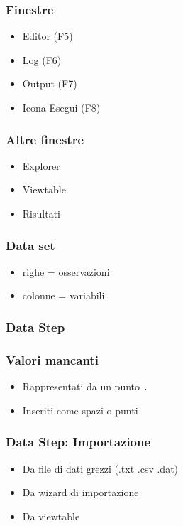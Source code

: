 \begin{frame}\frametitle{Finestre}
  \begin{itemize}
  \item
    Editor (F5)
  \item
    Log (F6)
  \item
    Output (F7)
  \item
    Icona Esegui (F8)
  \end{itemize}
\end{frame}

\begin{frame}\frametitle{Altre finestre}
  \begin{itemize}
  \item
    Explorer
  \item
    Viewtable
  \item
    Risultati
  \end{itemize}
\end{frame}

\begin{frame}\frametitle{Data set}
  \begin{itemize}
  \item
    righe = osservazioni
  \item
    colonne = variabili
  \end{itemize}
\end{frame}

\begin{frame}[fragile]\frametitle{Data Step}
\end{frame}


\begin{frame}\frametitle{Valori mancanti}
  \begin{itemize}
  \item
    Rappresentati da un punto \texttt{.}
  \item
    Inseriti come spazi o punti
  \end{itemize}\end{frame}


\begin{frame}\frametitle{Data Step: Importazione}
  \begin{itemize}
  \item
    Da file di dati grezzi (.txt .csv .dat)
  \item
    Da wizard di importazione
  \item
    Da viewtable
  \end{itemize}
\end{frame}

